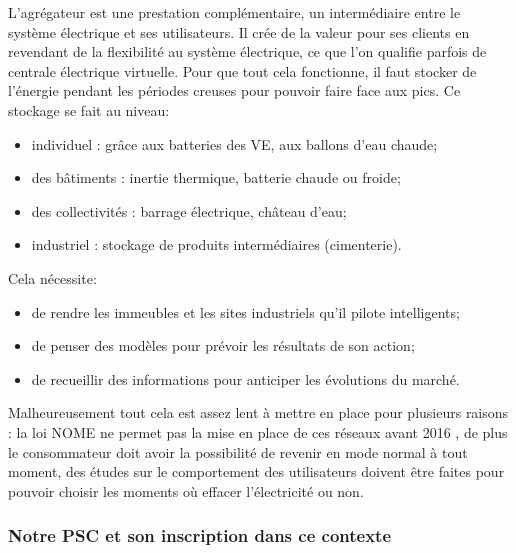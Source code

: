 L'agrégateur \cite{agregateur} est une prestation complémentaire, un intermédiaire entre le système électrique et ses utilisateurs. Il crée de la valeur pour ses clients en revendant de la flexibilité au système électrique, ce que l'on qualifie parfois de \og{}centrale électrique virtuelle\fg{}. Pour que tout cela fonctionne, il faut stocker de l'énergie pendant les périodes creuses pour pouvoir faire face aux pics. Ce stockage se fait au niveau:
\begin{itemize}
	\item individuel : grâce aux batteries des VE, aux ballons d'eau chaude;
	\item des bâtiments : inertie thermique, batterie chaude ou froide;
	\item des collectivités : barrage électrique, château d'eau;
	\item industriel : stockage de produits intermédiaires (cimenterie).
\end{itemize}
\bigskip

Cela nécessite:
\begin{itemize}
	\item de rendre les immeubles et les sites industriels qu'il pilote \og{}intelligents\fg{};
	\item de penser des modèles pour prévoir les résultats de son action;
	\item de recueillir des informations pour anticiper les évolutions du marché.
\end{itemize}
\bigskip

Malheureusement tout cela est assez lent à mettre en place pour plusieurs raisons : la loi NOME ne permet pas la mise en place de ces réseaux avant 2016 \cite{loiNome}, de plus le consommateur doit avoir la possibilité de revenir en mode \og{}normal\fg{} à tout moment, des études sur le comportement des utilisateurs doivent être faites pour pouvoir choisir les moments où effacer l'électricité ou non.

\subsubsection{Notre PSC et son inscription dans ce contexte}

